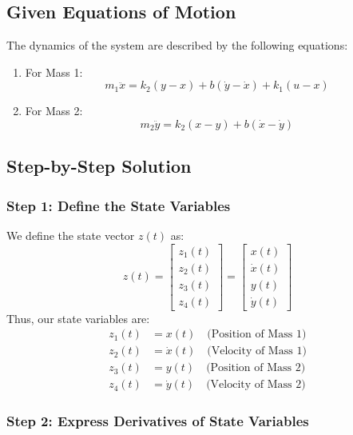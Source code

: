 \documentclass[12pt]{article}
\begin{document}
\subsection*{Given Equations of Motion}

The dynamics of the system are described by the following equations:

\begin{enumerate}
    \item For Mass 1:
    \[
    m_1 \ddot{x} = k_2 (y - x) + b (\dot{y} - \dot{x}) + k_1 (u - x)
    \]
    \item For Mass 2:
    \[
    m_2 \ddot{y} = k_2 (x - y) + b (\dot{x} - \dot{y})
    \]
\end{enumerate}


\subsection*{Step-by-Step Solution}

\subsubsection*{Step 1: Define the State Variables}

We define the state vector \( z(t) \) as:
\[
z(t) = \begin{bmatrix}
z_1(t) \\
z_2(t) \\
z_3(t) \\
z_4(t)
\end{bmatrix}
=
\begin{bmatrix}
x(t) \\
\dot{x}(t) \\
y(t) \\
\dot{y}(t)
\end{bmatrix}
\]
Thus, our state variables are:
\begin{align*}
z_1(t) &= x(t) \quad \text{(Position of Mass 1)} \\
z_2(t) &= \dot{x}(t) \quad \text{(Velocity of Mass 1)} \\
z_3(t) &= y(t) \quad \text{(Position of Mass 2)} \\
z_4(t) &= \dot{y}(t) \quad \text{(Velocity of Mass 2)}
\end{align*}

\subsubsection*{Step 2: Express Derivatives of State Variables}
\end{document}

